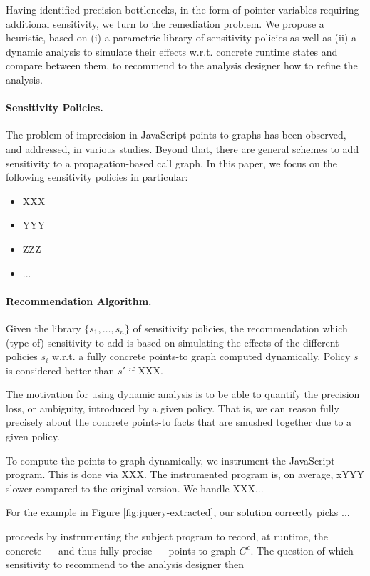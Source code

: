 \documentclass[a4paper,UKenglish]{lipics}
\begin{document}
Having identified precision bottlenecks, in the form of pointer variables requiring additional sensitivity, we turn to the remediation problem. We propose a heuristic, based on (i) a parametric library of sensitivity policies as well as (ii) a dynamic analysis to simulate their effects w.r.t. concrete runtime states and compare between them, to recommend to the analysis designer how to refine the analysis.

\paragraph{Sensitivity Policies.} The problem of imprecision in JavaScript points-to graphs has been observed, and addressed, in various studies. Beyond that, there are general schemes to add sensitivity to a propagation-based call graph. In this paper, we focus on the following sensitivity policies in particular:
\begin{itemize}
	\item XXX
	\item YYY
	\item ZZZ
	\item ...
\end{itemize}

\paragraph{Recommendation Algorithm.} Given the library $\{ s_1,\ldots, s_n \}$ of sensitivity policies, the recommendation which (type of) sensitivity to add is based on simulating the effects of the different policies $s_i$ w.r.t. a fully concrete points-to graph computed dynamically. Policy $s$ is considered better than $s'$ if XXX.

The motivation for using dynamic analysis is to be able to quantify the precision loss, or ambiguity, introduced by a given policy. That is, we can reason fully precisely about the concrete points-to facts that are smushed together due to a given policy.

To compute the points-to graph dynamically, we instrument the JavaScript program. This is done via XXX. The instrumented program is, on average, xYYY slower compared to the original version. We handle XXX...

For the example in Figure \ref{fig:jquery-extracted}, our solution correctly picks ...




proceeds by instrumenting the subject program to record, at runtime, the concrete --- and thus fully precise --- points-to graph $G^c$. The question of which sensitivity to recommend to the analysis designer then 
\end{document}
